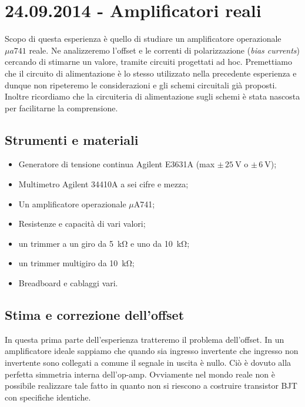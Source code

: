 \section{24.09.2014 - Amplificatori reali}

Scopo di questa esperienza è quello di studiare un amplificatore operazionale $\mu a 741$ reale.
Ne analizzeremo l'offset e le correnti di polarizzazione (\textit{bias currents}) cercando di stimarne un valore, tramite circuiti progettati ad hoc.
Premettiamo che il circuito di alimentazione è lo stesso utilizzato nella precedente esperienza e dunque non ripeteremo le considerazioni e gli schemi circuitali già proposti.
Inoltre ricordiamo che la circuiteria di alimentazione sugli schemi è stata nascosta per facilitarne la comprensione.

\subsection{Strumenti e materiali}

\begin{itemize} [noitemsep]
\item Generatore di tensione continua Agilent E3631A (max $\pm \, \SI{25}{\volt}$ o $\pm \, \SI{6}{\volt}$);
\item Multimetro Agilent 34410A a sei cifre e mezza;
\item Un amplificatore operazionale $\mu$A741;
\item Resistenze e capacità di vari valori;
\item un trimmer a un giro da \SI{5}{\kilo\ohm} e uno da \SI{10}{\kilo\ohm};
\item un trimmer multigiro da \SI{10}{\kilo\ohm};
\item Breadboard e cablaggi vari.
\end{itemize}

\subsection{Stima e correzione dell'offset}
\label{par2:offset}

In questa prima parte dell'esperienza tratteremo il problema dell'offset. In un amplificatore ideale sappiamo che quando sia ingresso invertente che ingresso non invertente sono collegati a comune il segnale in uscita è nullo. Ciò è dovuto alla perfetta simmetria interna dell'op-amp. Ovviamente nel mondo reale non è possibile realizzare tale fatto in quanto non si riescono a costruire transistor BJT con specifiche identiche. 

